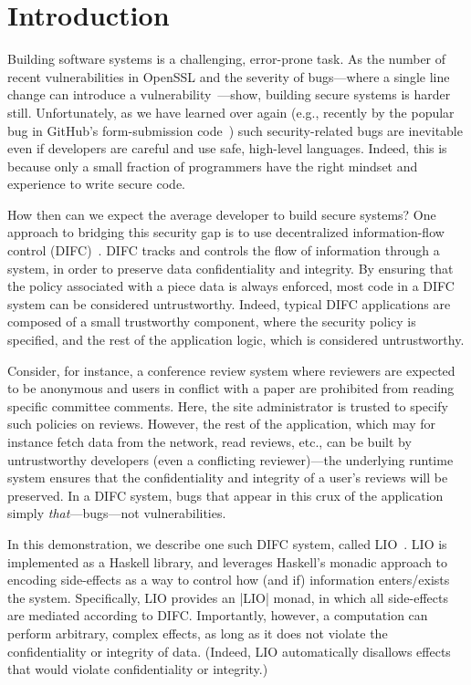 \section{Introduction}
\label{sec:intro}

Building software systems is a challenging, error-prone task.
%
As the number of recent vulnerabilities in OpenSSL and the severity of
bugs---where a single line change can introduce a
vulnerability~\tocite{}---show, building secure systems is harder still.
%
Unfortunately, as we have learned over again (e.g., recently by the
popular bug in GitHub's form-submission code~\tocite{}) such
security-related bugs are inevitable even if developers are careful
and use safe, high-level languages.
%
Indeed, this is because only a small fraction of programmers have the
right mindset and experience to write secure code.
%


How then can we expect the average developer to build secure systems?
%
One approach to bridging this security gap is to use decentralized
information-flow control (DIFC)~\cite{myers:dlm,
sabelfeld:language-based-iflow}.
%
DIFC tracks and controls the flow of information through a system, in
order to preserve data confidentiality and integrity.
%
By ensuring that the policy associated with a piece data is always
enforced, most code in a DIFC system can be considered untrustworthy.
%
Indeed, typical DIFC applications are composed of a small trustworthy
component, where the security policy is specified, and the rest of the
application logic, which is considered untrustworthy.
%

%
Consider, for instance, a conference review system where reviewers are
expected to be anonymous and users in conflict with a paper are
prohibited from reading specific committee comments.
%
Here, the site administrator is trusted to specify such policies on
reviews. 
%
However, the rest of the application, which may for instance fetch
data from the network, read reviews, etc., can be built by
untrustworthy developers (even a conflicting reviewer)---the
underlying runtime system ensures that the confidentiality and
integrity of a user's reviews will be preserved.
%
In a DIFC system, bugs that appear in this crux of the application
simply \emph{that}---bugs---not vulnerabilities.

In this demonstration, we describe one such DIFC system, called
LIO~\cite{lio, concurrent-lio}.
%
LIO is implemented as a Haskell library, and leverages Haskell's
monadic approach to encoding side-effects as a way to control how (and
if) information enters/exists the system.
%
Specifically, LIO provides an \hs|LIO| monad, in which
all side-effects are mediated according to DIFC.
%
Importantly, however, a computation can perform arbitrary, complex
effects, as long as it does not violate the confidentiality or
integrity of data.
%
(Indeed, LIO automatically disallows effects that would violate
confidentiality or integrity.)
